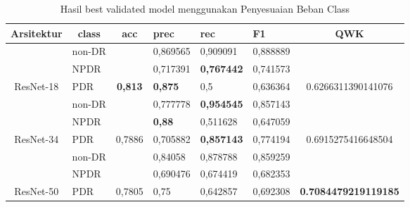 \begin{table}[H]
	\begin{center}
		\caption{Hasil best validated model menggunakan Penyesuaian Beban Class}
		\label{tb:HasilValClassWeight}
		\begin{tabular}{|c|l|c|l|l|l|c|}
			\hline
			\rowcolor[HTML]{C0C0C0} 
			Arsitektur & \multicolumn{1}{c|}{\cellcolor[HTML]{C0C0C0}class} & acc                      & prec     & rec      & F1       & QWK                                  \\ \hline
			& non-DR                                             &                          & 0,869565 & 0,909091 & 0,888889 &                                      \\ \cline{2-2} \cline{4-6}
			& NPDR                                               &                          & 0,717391 & \textbf{0,767442} & 0,741573 &                             \\ \cline{2-2} \cline{4-6}
			\multirow{-3}{*}{ResNet-18}  & PDR                                                & \multirow{-3}{*}{\textbf{0,813}}  & \textbf{0,875}    & 0,5      & 0,636364 & \multirow{-3}{*}{0.6266311390141076} \\ \hline
			& non-DR                                             &                          & 0,777778 & \textbf{0,954545} & 0,857143 &                             \\ \cline{2-2} \cline{4-6}
			& NPDR                                               &                          & \textbf{0,88}     & 0,511628 & 0,647059 &                              \\ \cline{2-2} \cline{4-6}
			\multirow{-3}{*}{ResNet-34}  & PDR                                                & \multirow{-3}{*}{0,7886} & 0,705882 & \textbf{0,857143} & 0,774194 & \multirow{-3}{*}{0.6915275416648504} \\ \hline
			& non-DR                                             &                          & 0,84058  & 0,878788 & 0,859259 &                                      \\ \cline{2-2} \cline{4-6}
			& NPDR                                               &                          & 0,690476 & 0,674419 & 0,682353 &                                      \\ \cline{2-2} \cline{4-6}
			\multirow{-3}{*}{ResNet-50}  & PDR                                                & \multirow{-3}{*}{0,7805} & 0,75     & 0,642857 & 0,692308 & \multirow{-3}{*}{\textbf{0.7084479219119185}} \\ \hline

\end{tabular}
\end{center}
\end{table}
